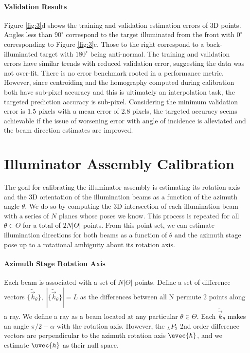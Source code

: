 \paragraph{Validation Results} Figure \ref{fig:3}d shows the training and validation estimation errors of 3D points. Angles less than $90^\circ$ correspond to the target illuminated from the front with $0^\circ$ corresponding to Figure \ref{fig:3}c. Those to the right correspond to a back-illuminated target with $180^\circ$ being anti-normal. The training and validation errors have similar trends with reduced validation error, suggesting the data was not over-fit. There is no error benchmark rooted in a performance metric. However, since centroiding and the homography computed during calibration both have sub-pixel accuracy and this is ultimately an interpolation task, the targeted prediction accuracy is sub-pixel. Considering the minimum validation error is 1.5 pixels with a mean error of 2.8 pixels, the targeted accuracy seems achievable if the issue of worsening error with angle of incidence is alleviated and the beam direction estimates are improved.



\section{Illuminator Assembly Calibration}
The goal for calibrating the illuminator assembly is estimating its rotation axis and the 3D orientation of the illumination beams as a function of the azimuth angle $\theta$. We do so by computing the 3D intersection of each illumination beam with a series of $N$ planes whose poses we know. This process is repeated for all $\theta \in \Theta$ for a total of $2N|\Theta|$ points. From this point set, we can estimate illumination directions for both beams as a function of $\theta$ and the azimuth stage pose up to a rotational ambiguity about its rotation axis.

\paragraph{Azimuth Stage Rotation Axis}
Each beam is associated with a set of $N|\Theta|$ points. Define a set of difference vectors $\{\tilde{\vec{k}}_\theta\}, \; |\{\tilde{\vec{k}}_\theta\}| = L$ as the differences between all N permute 2 points along a ray. We define a ray as a beam located at any particular $\theta \in \Theta$. Each $\tilde{\vec{k}}_\theta$ makes an angle $\pi/2 - \alpha$ with the rotation axis. However, the $_L P_2$ 2nd order difference vectors are perpendicular to the azimuth rotation axis $\uvec{h}$, and we estimate $\uvec{h}$ as their null space.

